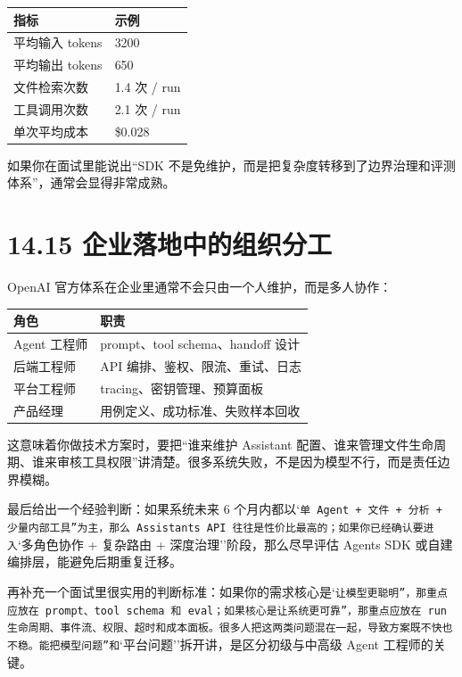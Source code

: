 \begingroup
\scriptsize
\setlength{\tabcolsep}{3pt}
\begin{longtable}{|p{}|p{}|}
\hline
指标 & 示例 \\ \hline
平均输入 tokens & 3200 \\ \hline
平均输出 tokens & 650 \\ \hline
文件检索次数 & 1.4 次 / run \\ \hline
工具调用次数 & 2.1 次 / run \\ \hline
单次平均成本 & \$0.028 \\ \hline
\end{longtable}
\endgroup

如果你在面试里能说出``SDK 不是免维护，而是把复杂度转移到了边界治理和评测体系''，通常会显得非常成熟。


\section{14.15 企业落地中的组织分工}

OpenAI 官方体系在企业里通常不会只由一个人维护，而是多人协作：


\begingroup
\scriptsize
\setlength{\tabcolsep}{3pt}
\begin{longtable}{|p{}|p{}|}
\hline
角色 & 职责 \\ \hline
Agent 工程师 & prompt、tool schema、handoff 设计 \\ \hline
后端工程师 & API 编排、鉴权、限流、重试、日志 \\ \hline
平台工程师 & tracing、密钥管理、预算面板 \\ \hline
产品经理 & 用例定义、成功标准、失败样本回收 \\ \hline
\end{longtable}
\endgroup

这意味着你做技术方案时，要把``谁来维护 Assistant 配置、谁来管理文件生命周期、谁来审核工具权限''讲清楚。很多系统失败，不是因为模型不行，而是责任边界模糊。


最后给出一个经验判断：如果系统未来 6 个月内都以`\texttt{单 Agent + 文件 + 分析 + 少量内部工具''为主，那么 Assistants API 往往是性价比最高的；如果你已经确认要进入}`多角色协作 + 复杂路由 + 深度治理''阶段，那么尽早评估 Agents SDK 或自建编排层，能避免后期重复迁移。


再补充一个面试里很实用的判断标准：如果你的需求核心是`\texttt{让模型更聪明''，那重点应放在 prompt、tool schema 和 eval；如果核心是}\texttt{让系统更可靠''，那重点应放在 run 生命周期、事件流、权限、超时和成本面板。很多人把这两类问题混在一起，导致方案既不快也不稳。能把}\texttt{模型问题''和}`平台问题''拆开讲，是区分初级与中高级 Agent 工程师的关键。



